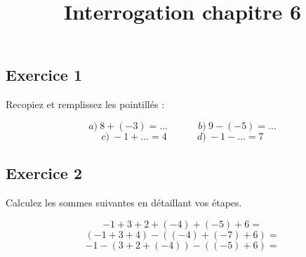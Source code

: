 \documentclass[14pt]{extreport}
\title{Interrogation chapitre 6}
\date{}
\theoremstyle{plain}
\begin{document}
\subsection*{Exercice 1}  %

Recopiez et remplissez les pointillés :

\[ a)\ 8 + (-3) =\ldots \ \ \ \ \ \ \ \ \ \ \ \ \ \ 
 b)\ 9 - (-5) = \ldots \]
\[ c)\ -1 + \ldots = 4  \ \ \ \ \ \ \ \ \ \ \ \ \ \  
d)\ -1 - \ldots = 7\]

\subsection*{Exercice 2} %

Calculez les sommes suivantes en détaillant vos étapes. 

\[ -1  + 3 + 2 + (-4) + (-5) + 6  = \]
\[ (-1  + 3 + 4) - ((-4) + (-7) + 6 ) = \]
\[ -1  - ( 3 + 2 + (-4) ) - ((-5) + 6)= \]
 
\end{document}
